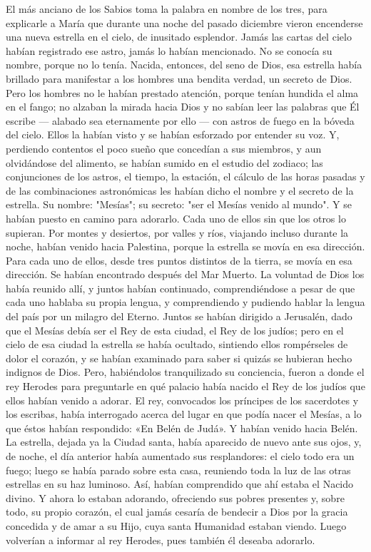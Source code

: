 \documentclass[12pt]{book} %
\begin{document}
El más anciano de los Sabios toma la palabra en nombre de los tres, para explicarle a María que durante una noche del pasado diciembre vieron encenderse una nueva estrella en el cielo, de inusitado esplendor. Jamás las cartas del cielo habían registrado ese astro, jamás lo habían mencionado. No se conocía su nombre, porque no lo tenía. Nacida, entonces, del seno de Dios, esa estrella había brillado para manifestar a los hombres una bendita verdad, un secreto de Dios. Pero los hombres no le habían prestado atención, porque tenían hundida el alma en el fango; no alzaban la mirada hacia Dios y no sabían leer las palabras que Él escribe — alabado sea eternamente por ello — con astros de fuego en la bóveda del cielo. 
Ellos la habían visto y se habían esforzado por entender su voz. Y, perdiendo contentos el poco sueño que concedían a sus miembros, y aun olvidándose del alimento, se habían sumido en el estudio del zodiaco; las conjunciones de los astros, el tiempo, la estación, el cálculo de las horas pasadas y de las combinaciones astronómicas les habían dicho el nombre y el secreto de la estrella. Su nombre: "Mesías"; su secreto: "ser el Mesías venido al mundo". Y se habían puesto en camino para adorarlo. Cada uno de ellos sin que los otros lo supieran. Por montes y desiertos, por valles y ríos, viajando incluso durante la noche, habían venido hacia Palestina, porque la estrella se movía en esa dirección. Para cada uno de ellos, desde tres puntos distintos de la tierra, se movía en esa dirección. Se habían encontrado después del Mar Muerto. La voluntad de Dios los había reunido allí, y juntos habían continuado, comprendiéndose a pesar de que cada uno hablaba su propia lengua, y comprendiendo y pudiendo hablar la lengua del país por un milagro del Eterno. 
Juntos se habían dirigido a Jerusalén, dado que el Mesías debía ser el Rey de esta ciudad, el Rey de los judíos; pero en el 
cielo de esa ciudad la estrella se había ocultado, sintiendo ellos rompérseles de dolor el corazón, y se habían examinado para saber si quizás se hubieran hecho indignos de Dios. Pero, habiéndolos tranquilizado su conciencia, fueron a donde el rey Herodes para preguntarle en qué palacio había nacido el Rey de los judíos que ellos habían venido a adorar. El rey, convocados los príncipes de los sacerdotes y los escribas, había interrogado acerca del lugar en que podía nacer el Mesías, a lo que éstos habían respondido: «En Belén de Judá». 
Y habían venido hacia Belén. La estrella, dejada ya la Ciudad santa, había aparecido de nuevo ante sus ojos, y, de noche, 
el día anterior había aumentado sus resplandores: el cielo todo era un fuego; luego se había parado sobre esta casa, reuniendo toda la luz de las otras estrellas en su haz luminoso. Así, habían comprendido que ahí estaba el Nacido divino. Y ahora lo estaban adorando, ofreciendo sus pobres presentes y, sobre todo, su propio corazón, el cual jamás cesaría de bendecir a Dios por la gracia concedida y de amar a su Hijo, cuya santa Humanidad estaban viendo. Luego volverían a informar al rey Herodes, pues también él deseaba adorarlo. 
\end{document}
